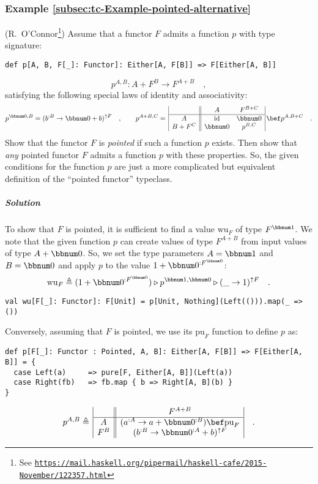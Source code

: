 \subsubsection{Example \label{subsec:tc-Example-pointed-alternative}\ref{subsec:tc-Example-pointed-alternative}}

(R.~O\textsf{'}Connor\footnote{See \texttt{\href{https://mail.haskell.org/pipermail/haskell-cafe/2015-November/122357.html}{https://mail.haskell.org/pipermail/haskell-cafe/2015-November/122357.html}}})
Assume that a functor $F$ admits a function $p$ with type signature:
\begin{lstlisting}
def p[A, B, F[_]: Functor]: Either[A, F[B]] => F[Either[A, B]]
\end{lstlisting}
\[
p^{A,B}:A+F^{B}\rightarrow F^{A+B}\quad,
\]
 satisfying the following special laws of identity and associativity:
\[
p^{\bbnum 0,B}=(b^{:B}\rightarrow\bbnum 0+b)^{\uparrow F}\quad,\quad\quad p^{A+B,C}=\,\begin{array}{|c||cc|}
 & A & F^{B+C}\\
\hline A & \text{id} & \bbnum 0\\
B+F^{C} & \bbnum 0 & p^{B,C}
\end{array}\,\bef p^{A,B+C}\quad.
\]
Show that the functor $F$ is \emph{pointed} if such a function $p$
exists. Then show that \emph{any} pointed functor $F$ admits a function
$p$ with these properties. So, the given conditions for the function
$p$ are just a more complicated but equivalent definition of the
\textsf{``}pointed functor\textsf{''} typeclass.

\subparagraph{Solution}

To show that $F$ is pointed, it is sufficient to find a value $\text{wu}_{F}$
of type $F^{\bbnum 1}$. We note that the given function $p$ can
create values of type $F^{A+B}$ from input values of type $A+\bbnum 0$.
So, we set the type parameters $A=\bbnum 1$ and $B=\bbnum 0$ and
apply $p$ to the value $1+\bbnum 0^{:F^{\bbnum 0}}$:
\[
\text{wu}_{F}\triangleq(1+\bbnum 0^{:F^{\bbnum 0}})\triangleright p^{\bbnum 1,\bbnum 0}\triangleright(\_\rightarrow1)^{\uparrow F}\quad.
\]
\begin{lstlisting}
val wu[F[_]: Functor]: F[Unit] = p[Unit, Nothing](Left(())).map(_ => ())
\end{lstlisting}

Conversely, assuming that $F$ is pointed, we use its $\text{pu}_{F}$
function to define $p$ as:
\begin{lstlisting}
def p[F[_]: Functor : Pointed, A, B]: Either[A, F[B]] => F[Either[A, B]] = {
  case Left(a)     => pure[F, Either[A, B]](Left(a))
  case Right(fb)   => fb.map { b => Right[A, B](b) }
}
\end{lstlisting}
\[
p^{A,B}\triangleq\,\begin{array}{|c||c|}
 & F^{A+B}\\
\hline A & (a^{:A}\rightarrow a+\bbnum 0^{:B})\bef\text{pu}_{F}\\
F^{B} & (b^{:B}\rightarrow\bbnum 0^{:A}+b)^{\uparrow F}
\end{array}\quad.
\]

